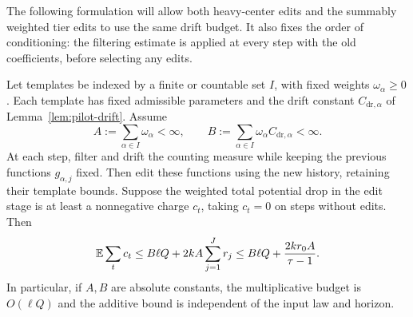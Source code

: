The following formulation will allow both heavy-center edits and the
summably weighted tier edits to use the same drift budget.  It also fixes
the order of conditioning: the filtering estimate is applied at every
step with the old coefficients, before selecting any edits.

\begin{corollary}
\label{cor:pilot-edits}
Let templates be indexed by a finite or countable set $I$, with fixed
weights $\omega_\alpha\ge0$.  Each template has fixed admissible
parameters and the drift constant $C_{\mathrm{dr},\alpha}$ of
Lemma~\ref{lem:pilot-drift}.  Assume
\[
 A:=\sum_{\alpha\in I}\omega_\alpha<\infty,
 \qquad
 B:=\sum_{\alpha\in I}\omega_\alpha C_{\mathrm{dr},\alpha}<\infty.
\]
At each step, filter and drift the counting measure while keeping the
previous functions $g_{\alpha,j}$ fixed.  Then edit these functions using
the new history, retaining their template bounds.  Suppose the weighted
total potential drop in the edit stage is at least a nonnegative charge
$c_t$, taking $c_t=0$ on steps without edits.  Then
\begin{equation}
 \mathbb E\sum_t c_t
 \le B\ell Q+2kA\sum_{j=1}^Jr_j
 \le B\ell Q+\frac{2kr_0A}{\tau-1}.
 \label{eq:pilot-edit-budget}
\end{equation}
In particular, if $A,B$ are absolute constants, the multiplicative
budget is $O(\ell Q)$ and the additive bound is independent of the input
law and horizon.
\end{corollary}

